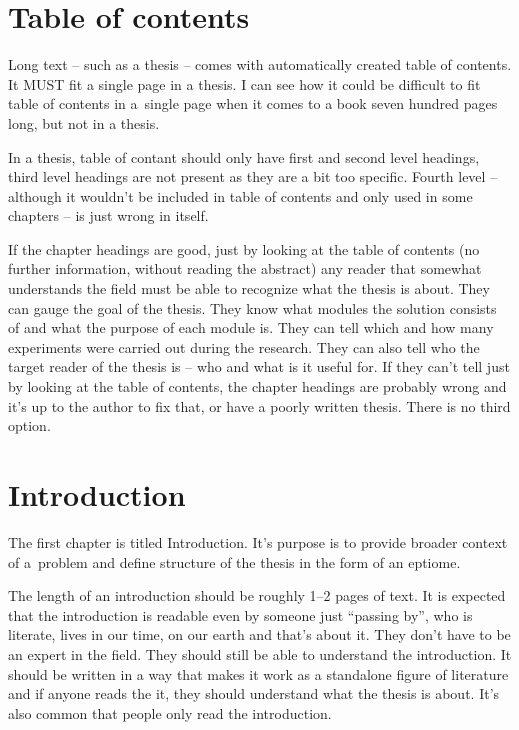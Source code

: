 {{\section{Table of contents}
\label{obsah}

Long text -- such as a thesis -- comes with automatically created table of contents. It MUST fit a single page in a thesis. I can see how it could be difficult to fit table of contents in a~single page when it comes to a book seven hundred pages long, but not in a thesis.

In a thesis, table of contant should only have first and second level headings, third level headings are not present as they are a bit too specific. Fourth level -- although it wouldn't be included in table of contents and only used in some chapters -- is just wrong in itself.

If the chapter headings are good, just by looking at the table of contents (no further information, without reading the abstract) any reader that somewhat understands the field must be able to recognize what the thesis is about. They can gauge the goal of the thesis. They know what modules the solution consists of and what the purpose of each module is.
They can tell which and how many experiments were carried out during the research. They can also tell who the target reader of the thesis is -- who and what is it useful for. If they can't tell just by looking at the table of contents, the chapter headings are probably wrong and it's up to the author to fix that, or have a poorly written thesis. There is no third option.


\section{Introduction}
\label{uvod}

The first chapter is titled Introduction. It's purpose is to provide broader context of a~problem and define structure of the thesis in the form of an eptiome.

The length of an introduction should be roughly 1--2 pages of text. It is expected that the introduction is readable even by someone just ``passing by'', who is literate, lives in our time, on our earth and that's about it. They don't have to be an expert in the field. They should still be able to understand the introduction. It should be written in a way that makes it work as a standalone figure of literature and if anyone reads the it, they should understand what the thesis is about. It's also common that people only read the introduction.

}}
